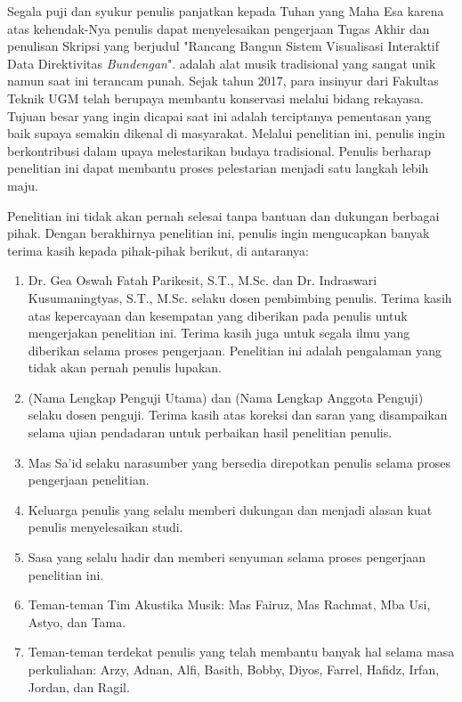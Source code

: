 Segala puji dan syukur penulis panjatkan kepada Tuhan yang Maha Esa karena atas kehendak-Nya penulis dapat menyelesaikan pengerjaan Tugas Akhir dan penulisan Skripsi yang berjudul "Rancang Bangun Sistem Visualisasi Interaktif Data Direktivitas \emph{Bundengan}". \Bundengan adalah alat musik tradisional yang sangat unik namun saat ini terancam punah. Sejak tahun 2017, para insinyur dari Fakultas Teknik UGM telah berupaya membantu konservasi \bundengan melalui bidang rekayasa. Tujuan besar yang ingin dicapai saat ini adalah terciptanya pementasan \bundengan yang baik supaya \bundengan semakin dikenal di masyarakat. Melalui penelitian ini, penulis ingin berkontribusi dalam upaya melestarikan budaya tradisional. Penulis berharap penelitian ini dapat membantu proses pelestarian \bundengan menjadi satu langkah lebih maju. \par

Penelitian ini tidak akan pernah selesai tanpa bantuan dan dukungan berbagai pihak. Dengan berakhirnya penelitian ini, penulis ingin mengucapkan banyak terima kasih kepada pihak-pihak berikut, di antaranya: \par 

\begin{enumerate}
	\item Dr. Gea Oswah Fatah Parikesit, S.T., M.Sc. dan Dr. Indraswari Kusumaningtyas, S.T., M.Sc. selaku dosen pembimbing penulis. Terima kasih atas kepercayaan dan kesempatan yang diberikan pada penulis untuk mengerjakan penelitian ini. Terima kasih juga untuk segala ilmu yang diberikan selama proses pengerjaan. Penelitian ini adalah pengalaman yang tidak akan pernah penulis lupakan.
	\item (Nama Lengkap Penguji Utama) dan (Nama Lengkap Anggota Penguji) selaku dosen penguji. Terima kasih atas koreksi dan saran yang disampaikan selama ujian pendadaran untuk perbaikan hasil penelitian penulis.
	\item Mas Sa’id selaku narasumber yang bersedia direpotkan penulis selama proses pengerjaan penelitian.
	\item Keluarga penulis yang selalu memberi dukungan dan menjadi alasan kuat penulis menyelesaikan studi.
	\item Sasa yang selalu hadir dan memberi senyuman selama proses pengerjaan penelitian ini.
	\item Teman-teman Tim Akustika Musik: Mas Fairuz, Mas Rachmat, Mba Usi, Astyo, dan Tama.
	\item Teman-teman terdekat penulis yang telah membantu banyak hal selama masa perkuliahan: Arzy, Adnan, Alfi, Basith, Bobby, Diyos, Farrel, Hafidz, Irfan, Jordan, dan Ragil.
\end{enumerate}

